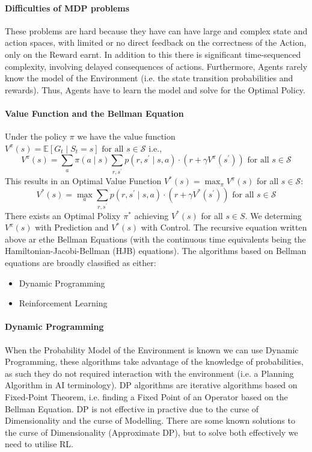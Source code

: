 \documentclass[11pt]{article}
\begin{document}
\paragraph*{Difficulties of MDP problems}
These problems are hard because they have can have large and complex state and action spaces, with limited or no direct feedback on the correctness of the Action, only on the Reward earnt. 
In addition to this there is significant time-sequenced complexity, involving delayed consequences of actions. 
Furthermore, Agents rarely know the model of the Environment (i.e. the state transition probabilities and rewards). Thus, Agents have to learn the model and solve for the Optimal Policy. 

\paragraph*{Value Function and the Bellman Equation}
Under the policy $\pi$ we have the value function $V^\pi(s)=\mathbb{E}\left[G_t \mid S_t=s\right] \text { for all } s \in \mathcal{S}$ i.e.,
$$
V^\pi(s)=\sum_a \pi(a \mid s) \sum_{r, s^{\prime}} p\left(r, s^{\prime} \mid s, a\right) \cdot\left(r+\gamma V^\pi\left(s^{\prime}\right)\right) \text { for all } s \in \mathcal{S}
$$
This results in an Optimal Value Function $V^*(s)=\max _\pi V^\pi(s)$ for all $s \in \mathcal{S}$:
$$
V^*(s)=\max _a \sum_{r, s^{\prime}} p\left(r, s^{\prime} \mid s, a\right) \cdot\left(r+\gamma V^*\left(s^{\prime}\right)\right) \text { for all } s \in \mathcal{S}
$$
There exists an Optimal Polixy $\pi^*$ achieving $V^*(s)$ for all $s \in S$. We determing $V^\pi(s)$ with Prediction and $V^*(s)$ with Control. The recursive equation written above ar ethe Bellman Equations (with the continuous time equivalents being the Hamiltonian-Jacobi-Bellman (HJB) equations). The algorithms based on Bellman equations are broadly classified as either:
\begin{itemize}
    \item Dynamic Programming
    \item Reinforcement Learning
\end{itemize}

\paragraph*{Dynamic Programming}
When the Probability Model of the Environment is known we can use Dynamic Programming, these algorithms take advantage of the knowledge of probabilities, as such they do not required interaction with the environment (i.e. a Planning Algorithm in AI terminology).
DP algorithms are iterative algorithms based on Fixed-Point Theorem, i.e. finding a Fixed Point of an Operator based on the Bellman Equation. 
DP is not effective in practive due to the curse of Dimensionality and the curse of Modelling. 
There are some known solutions to the curse of Dimensionality (Approximate DP), but to solve both effectively we need to utilise RL.
\end{document}

